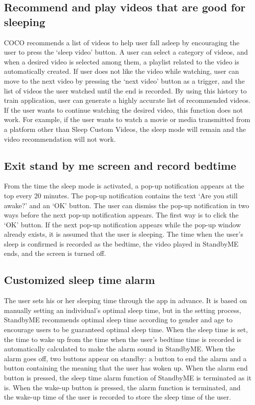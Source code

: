 \documentclass[conference]{IEEEtran}
\begin{document}
\subsection{Recommend and play videos that are good for sleeping}
COCO recommends a list of videos to help user fall asleep by encouraging the user to press the ‘sleep video’ button. A user can select a category of videos, and when a desired video is selected among them, a playlist related to the video is automatically created. If user does not like the video while watching, user can move to the next video by pressing the ‘next video’ button as a trigger, and the list of videos the user watched until the end is recorded. By using this history to train application, user can generate a highly accurate list of recommended videos. If the user wants to continue watching the desired video, this function does not work. For example, if the user wants to watch a movie or media transmitted from a platform other than Sleep Custom Videos, the sleep mode will remain and the video recommendation will not work.
\vspace{1\baselineskip}
\subsection{Exit stand by me screen and record bedtime}
From the time the sleep mode is activated, a pop-up notification appears at the top every 20 minutes. The pop-up notification contains the text ‘Are you still awake?’ and an ‘OK’ button. The user can dismiss the pop-up notification in two ways before the next pop-up notification appears. The first way is to click the ‘OK’ button. If the next pop-up notification appears while the pop-up window already exists, it is assumed that the user is sleeping. The time when the user's sleep is confirmed is recorded as the bedtime, the video played in StandbyME ends, and the screen is turned off.
\vspace{1\baselineskip}
\subsection{Customized sleep time alarm}
The user sets his or her sleeping time through the app in advance. It is based on manually setting an individual's optimal sleep time, but in the setting process, StandbyME recommends optimal sleep time according to gender and age to encourage users to be guaranteed optimal sleep time. When the sleep time is set, the time to wake up from the time when the user's bedtime time is recorded is automatically calculated to make the alarm sound in StandbyME. When the alarm goes off, two buttons appear on standby: a button to end the alarm and a button containing the meaning that the user has woken up. When the alarm end button is pressed, the sleep time alarm function of StandbyME is terminated as it is. When the wake-up button is pressed, the alarm function is terminated, and the wake-up time of the user is recorded to store the sleep time of the user.
\vspace{1\baselineskip}
\end{document}
